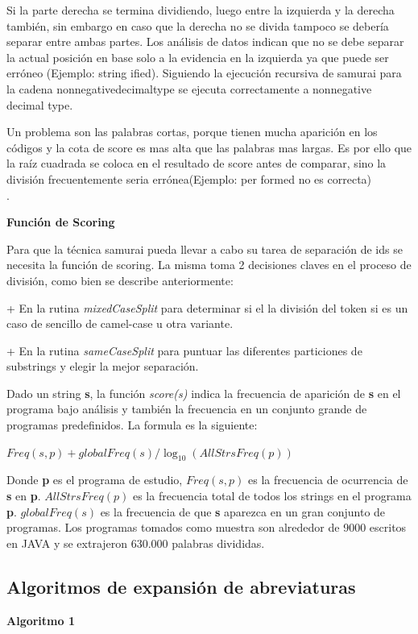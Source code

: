 \documentclass[12pt]{report}
\begin{document}
Si la parte derecha se termina dividiendo, luego entre la izquierda y la derecha también, sin embargo en caso que la derecha no se divida tampoco se debería separar entre ambas partes. Los análisis de datos indican que no se debe separar la actual posición en base solo a la evidencia en la izquierda ya que puede ser erróneo (Ejemplo: \textsf{string ified}). Siguiendo la ejecución recursiva de samurai para la cadena \textsf{nonnegativedecimaltype} se ejecuta correctamente a \textsf{nonnegative decimal type}.

Un problema son las palabras cortas, porque tienen mucha aparición en los códigos y la cota de score es mas alta que las palabras mas largas. Es por ello que la raíz cuadrada se coloca en el resultado de score antes de comparar, sino la división frecuentemente seria errónea(Ejemplo: \textsf{per formed} no es correcta)\cite{EHPV09}\\.

\noindent \textbf{Función de Scoring}

Para que la técnica samurai pueda llevar a cabo su tarea de separación de ids se necesita la función de scoring. La misma toma 2 decisiones claves en el proceso de división, como bien se describe anteriormente:

+ En la rutina \textit{mixedCaseSplit} para determinar si el la división del token si es un caso de sencillo de camel-case u otra variante.

+ En la rutina \textit{sameCaseSplit} para puntuar las diferentes particiones de substrings y elegir la mejor separación.

Dado un string \textbf{s}, la función \textit{score(s)} indica la frecuencia de aparición de \textbf{s} en el programa bajo análisis y también la frecuencia en un conjunto grande de programas predefinidos. La formula es la siguiente:

\begin{center}
$Freq(s,p) + globalFreq(s) / \log_{10}(AllStrsFreq(p))$
\end{center}

Donde \textbf{p} es el programa de estudio, $Freq(s,p)$ es la frecuencia de ocurrencia de \textbf{s} en \textbf{p}. $AllStrsFreq(p)$ es la frecuencia total de todos los strings en el programa \textbf{p}. $globalFreq(s)$ es la frecuencia de que \textbf{s} aparezca en un gran conjunto de programas. Los programas tomados como muestra son alrededor de 9000 escritos en JAVA y se extrajeron 630.000 palabras divididas\cite{EHPV09}.

\subsection{Algoritmos de expansión de abreviaturas}
\noindent \textbf{Algoritmo 1}
\end{document}
